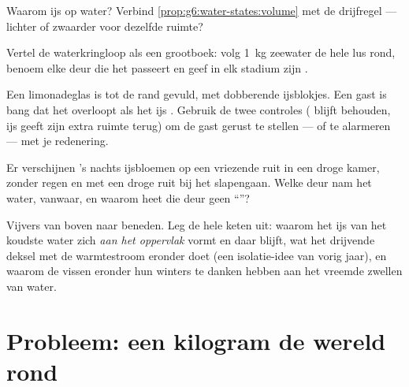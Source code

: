\begin{exercise}[$\star$]\label{exo:g6:water-states:8}
Waarom  ijs op water? Verbind
\cref{prop:g6:water-states:volume} met de drijfregel --- lichter of
zwaarder voor dezelfde ruimte?
\end{exercise}

\begin{exercise}[$\star\star$]\label{exo:g6:water-states:9}
Vertel de waterkringloop als een grootboek: volg \qty{1}{kg} zeewater
de hele lus rond, benoem elke deur die het passeert en geef in elk
stadium zijn .
\end{exercise}

\begin{exercise}[$\star\star$]\label{exo:g6:water-states:10}
Een limonadeglas is tot de rand gevuld, met dobberende ijsblokjes. Een
gast is bang dat het overloopt als het ijs . Gebruik de twee
controles ( blijft behouden, ijs geeft zijn extra ruimte terug) om
de gast gerust te stellen --- of te alarmeren --- met je redenering.
\end{exercise}

\begin{exercise}[$\star\star$]\label{exo:g6:water-states:11}
Er verschijnen 's nachts ijsbloemen op een vriezende ruit in een droge
kamer, zonder regen en met een droge ruit bij het slapengaan. Welke
deur nam het water, vanwaar, en waarom heet die deur geen ``''?
\end{exercise}

\begin{exercise}[$\star\star\star$]\label{exo:g6:water-states:12}
Vijvers  van boven naar beneden. Leg de hele keten uit:
waarom het ijs van het koudste water zich \emph{aan het oppervlak}
vormt en daar blijft, wat het drijvende deksel met de warmtestroom
eronder doet (een isolatie-idee van vorig jaar), en waarom de vissen
eronder hun winters te danken hebben aan het vreemde zwellen van
water.
\end{exercise}

\section{Probleem: een kilogram de wereld rond}

